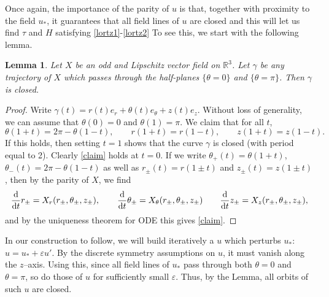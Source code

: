 \documentclass[11pt]{article}
\theoremstyle{plain}
\numberwithin{equation}{section}
\newtheorem{lemma}[thm]{Lemma}
\theoremstyle{remark}
\newcommand{\rmd}{{\rm d}}
\newcommand{\ve}{{\varepsilon}}
\begin{document}
Once again, the importance of the parity of $u$ is that, together with proximity to
the field $u_*$, it guarantees that all field lines of $u$ are closed
and this will let us find $\tau$ and $H$ satisfying \eqref{lortz1}-\eqref{lortz2}
To see this, we start with the following lemma. 
\begin{lemma}
  \label{closedlines}
  Let $X$ be an odd and Lipschitz vector field on $\mathbb{R}^3$. Let $\gamma$ be any trajectory of $X$
    which passes through the half-planes $\{\theta = 0\}$ and $\{\theta = \pi\}$. Then $\gamma$ is closed.
\end{lemma}
\begin{proof}
      Write $\gamma(t) = r(t)e_r + \theta(t) e_\theta + z(t) e_z$. Without loss
    of generality, we can assume that $\theta(0) = 0$ and $\theta(1) = \pi$.
    We claim that for all $t$,
    \begin{equation}
      \label{claim}
        \theta(1+t) = 2\pi - \theta(1-t),\qquad
        r(1+t) = r(1-t),\qquad
        z(1+t) = z(1-t).
    \end{equation}
    If this holds, then setting $t = 1$ shows that the curve $\gamma$ is closed (with period equal to 2).
    Clearly \eqref{claim} holds at $t = 0$. If we write $\theta_{+}(t) = \theta(1+t)$,
    $\theta_-(t) = 2\pi - \theta(1-t)$ as well as $r_{\pm}(t) = r(1\pm t)$ and
    $z_{\pm}(t) = z(1\pm t)$, then by the parity of $X$, we find
    \begin{equation}
      \label{}
      \frac{\rmd}{\rmd t} r_{\pm} = X_r(r_{\pm}, \theta_{\pm}, z_{\pm}),
      \qquad
      \frac{\rmd}{\rmd t} \theta_{\pm} = X_\theta(r_{\pm}, \theta_{\pm}, z_{\pm})
      \qquad
      \frac{\rmd}{\rmd t} z_{\pm} = X_z(r_{\pm}, \theta_{\pm}, z_{\pm}),
    \end{equation}
    and by the uniqueness theorem for ODE this gives \eqref{claim}.
\end{proof}


In our construction to follow, we will build iteratively a $u$ which perturbs $u_*$:
$u = u_* + \ve  u'$. 
By the discrete symmetry assumptions on $u$, it must vanish along the $z$--axis. 
Using this, since all field lines of $u_*$ pass through both
$\theta = 0$ and $\theta = \pi$,  so do those of $u$ for sufficiently small $\ve$. Thus, by the Lemma, all orbits of such $u$ are closed.
\end{document}
